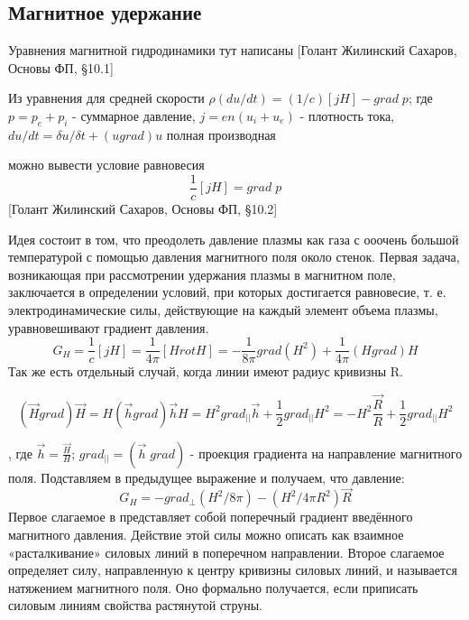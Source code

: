 \documentclass[10pt, a4paper]{article}
\begin{document}
\subsection{Магнитное удержание}
\label{14.1}

Уравнения магнитной гидродинамики тут написаны [Голант Жилинский Сахаров, Основы ФП,  §10.1]

Из уравнения для средней скорости $\rho (du/dt)=(1/c)[j H]-grad\;p$; где $p=p_e+p_i$ - суммарное давление, $j=en(u_i+u_e)$ - плотность тока, $ du/dt=\delta u / \delta t + (u grad)u$ полная производная

можно вывести условие равновесия
\begin{equation}
	\label{eq.Disp14.1.2}
	\frac{1}{c}[j H]=grad\;p
\end{equation}
[Голант Жилинский Сахаров, Основы ФП,  §10.2]


Идея состоит в том, что преодолеть давление плазмы как газа с ооочень большой температурой с помощью давления магнитного поля около стенок.
Первая задача, возникающая при рассмотрении удержания плазмы в магнитном поле, заключается в определении условий, при которых достигается равновесие, т. е. электродинамические силы, действующие на каждый элемент объема плазмы, уравновешивают градиент давления.
\begin{equation}
	\label{eq.Disp14.1.3}
	G_H=\frac{1}{c} [j H]=\frac{1}{4 \pi} [H rotH]=-\frac{1}{8 \pi} grad(H^{2})+\frac{1}{4 \pi} (H grad) H
\end{equation}
Так же есть отдельный случай, когда линии имеют радиус кривизны R.

\begin{equation}
	\label{eq.Disp14.1.4}
(\vec H grad)\vec H=H(\vec h grad)\vec h H=H^{2} grad_{||}\vec h + \frac{1}{2} grad_{||} H^{2}=-H^{2} \frac{\vec R}{R}+\frac{1}{2} grad_{||} H^{2}
\end{equation}


, где $\vec h= \frac{\vec H}{H}$; $grad_{||}=(\vec h \; grad)$ - проекция градиента на направление магнитного поля. Подставляем в предыдущее выражение и получаем, что давление:
\begin{equation}
	\label{eq.Disp14.1.5}
 G_H=-grad_{\perp}(H^{2}/8\pi)-(H^{2}/4\pi R^{2})\vec R
\end{equation}
Первое слагаемое в представляет собой поперечный градиент введённого магнитного давления. Действие этой силы можно описать как взаимное «расталкивание» силовых линий в поперечном направлении. Второе слагаемое определяет силу, направленную к центру кривизны силовых линий, и называется натяжением магнитного поля. Оно формально получается, если приписать силовым линиям свойства растянутой струны.
\end{document}
